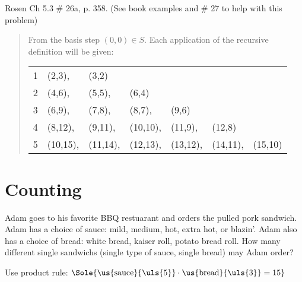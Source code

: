 \begin{questions}
 Rosen Ch 5.3 \# 26a, p. 358. (See book examples and \#
27 to help with this problem)
\begin{solution}
\begin{quote}
    From the basis step $(0,0) \in S$.  Each application of the recursive definition will be given:

    \begin{tabular}{rllllll}
    1 & (2,3), & (3,2) \\
    2 & (4,6), & (5,5), & (6,4) \\
    3 & (6,9), & (7,8), & (8,7), & (9,6) \\
    4 & (8,12), & (9,11), & (10,10), & (11,9), & (12,8) \\
    5 & (10,15), & (11,14), & (12,13), & (13,12), & (14,11), & (15,10) \\
    \end{tabular}
\end{quote}
\end{solution}


\section*{Counting}

 Adam goes to his favorite BBQ restuarant and orders the pulled pork sandwich.  Adam has a choice of sauce: mild, medium, hot, extra hot, or blazin'.  Adam also has a choice of bread: white bread, kaiser roll, potato bread roll.  How many different single sandwichs (single type of sauce, single bread) may Adam order?
\ifprintanswers
    \vspace{-10pt}
  \fi
  \begin{solution}
  Use product rule: $\Sole{ \us{\text{sauce}}{\uls{5}} \cdot \us{\text{bread}}{\uls{3}} = 15} $
  \end{solution}



\end{questions}
